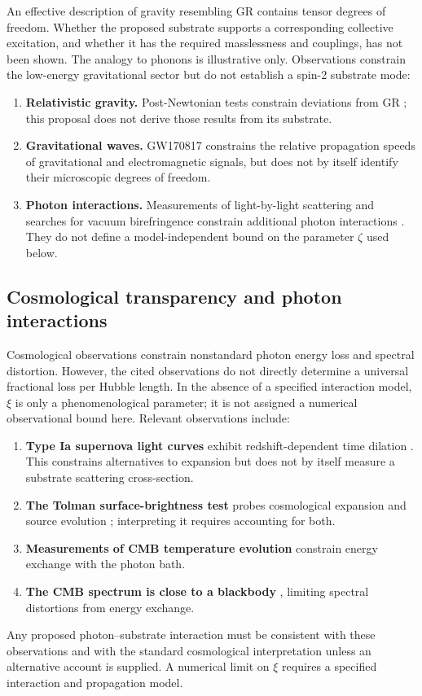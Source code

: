\documentclass[11pt,a4paper]{article}
\begin{document}
An effective description of gravity resembling GR contains tensor degrees of freedom. Whether
the proposed substrate supports a corresponding collective excitation, and whether it has the
required masslessness and couplings, has not been shown. The analogy to phonons is illustrative
only. Observations constrain the low-energy gravitational sector but do not establish a
spin-2 substrate mode:
\begin{enumerate}
\item \textbf{Relativistic gravity.} Post-Newtonian tests constrain deviations from GR
\cite{Will2018}; this proposal does not derive those results from its substrate.
\item \textbf{Gravitational waves.} GW170817 constrains the relative propagation speeds of
gravitational and electromagnetic signals, but does not by itself identify their microscopic
degrees of freedom.
\item \textbf{Photon interactions.} Measurements of light-by-light scattering and searches for
vacuum birefringence constrain additional photon interactions
\cite{ATLAS2019,PVLAS2016,Mignani2017}. They do not define a model-independent bound on the
parameter $\zeta$ used below.
\end{enumerate}

\subsection{Cosmological transparency and photon interactions}

Cosmological observations constrain nonstandard photon energy loss and spectral distortion.
However, the cited observations do not directly determine a universal fractional loss per Hubble
length. In the absence of a specified interaction model, $\xi$ is only a phenomenological
parameter; it is not assigned a numerical observational bound here. Relevant observations include:
\begin{enumerate}
\item \textbf{Type Ia supernova light curves} exhibit redshift-dependent time dilation
\cite{Goldhaber2001}. This constrains alternatives to expansion but does not by itself measure a
substrate scattering cross-section.
\item \textbf{The Tolman surface-brightness test} probes cosmological expansion and source
evolution \cite{Lubin2001}; interpreting it requires accounting for both.
\item \textbf{Measurements of CMB temperature evolution} constrain energy exchange with the
photon bath.
\item \textbf{The CMB spectrum is close to a blackbody} \cite{Fixsen1996}, limiting spectral
distortions from energy exchange.
\end{enumerate}
Any proposed photon--substrate interaction must be consistent with these observations and with
the standard cosmological interpretation unless an alternative account is supplied. A numerical
limit on $\xi$ requires a specified interaction and propagation model.
\end{document}

